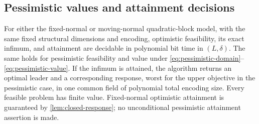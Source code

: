 \subsection{Pessimistic values and attainment decisions}\label{subsec:exact-pessimistic}

\begin{theorem}\label{thm:exact-semantics}
For either the fixed-normal or moving-normal quadratic-block model,
with the same fixed structural dimensions and encoding, optimistic
feasibility, its exact infimum, and attainment are decidable in polynomial
bit time in $(L,\delta)$. The same holds for pessimistic feasibility and
value under \eqref{eq:pessimistic-domain}--\eqref{eq:pessimistic-value}.
If the infimum is attained, the algorithm returns an optimal leader and
a corresponding response, worst for the upper objective in the
pessimistic case, in one common field of polynomial total encoding size.
Every feasible problem has finite value. Fixed-normal optimistic
attainment is guaranteed by \cref{lem:closed-response}; no unconditional
pessimistic attainment assertion is made.
\end{theorem}
